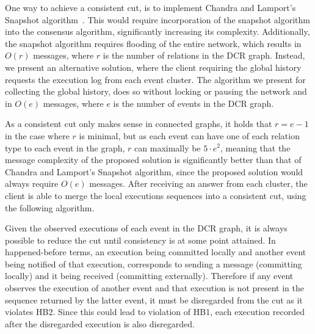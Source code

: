 \documentclass{article}
\begin{document}
	One way to achieve a consistent cut, is to implement Chandra and Lamport's Snapshot algorithm~\cite{chandy_distributed_1985}.
	This would require incorporation of the snapshot algorithm into the consensus algorithm, significantly increasing its complexity.
	Additionally, the snapshot algorithm requires flooding of the entire network, which results in $O(r)$  messages, where $r$ is the number of relations in the DCR graph.
	Instead, we present an alternative solution, where the client requiring the global history requests the execution log from each event cluster.
	The algorithm we present for collecting the global history, does so without locking or pausing the network and in $O(e)$ messages, where $e$ is the number of events in the DCR graph.

	As a consistent cut only makes sense in connected graphs, it holds that $r = e-1$ in the case where $r$ is minimal, but as each event can have one of each relation type to each event in the graph, $r$ can maximally be $5\cdot e^2$, meaning that the message complexity of the proposed solution is significantly better than that of Chandra and Lamport's Snapshot algorithm, since the proposed solution would always require $O(e)$ messages.
	After receiving an answer from each cluster, the client is able to merge the local executions sequences into a consistent cut, using the following algorithm.

	Given the observed executions of each event in the DCR graph, it is always possible to reduce the cut until consistency is at some point attained.
	In happened-before terms, an execution being committed locally and another event being notified of that execution, corresponds to sending a message (committing locally) and it being received (committing externally).
	Therefore if any event observes the execution of another event and that execution is not present in the sequence returned by the latter event, it must be disregarded from the cut as it violates HB2.
	Since this could lead to violation of HB1, each execution recorded after the disregarded execution is also disregarded.
\end{document}
